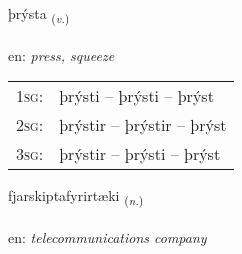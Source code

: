 \documentclass[frontgrid, backgrid]{flacards}\usepackage[]{graphicx}\usepackage[]{xcolor}
\begin{document}
\renewcommand{\flhead}{\vskip5pt \fboxsep=0pt {\small\bfseries\footnotesize Sagnorð | Verb}}
\renewcommand{\fcfoot}{\vskip5pt \fboxsep=0pt \hspace{2pt}{\small\bfseries\footnotesize 3K}}

\renewcommand{\blhead}{\vskip5pt {\small\bfseries\footnotesize Sagnorð | Verb }}
\renewcommand{\bcfoot}{\vskip5pt \hspace{2pt}{\small\bfseries\footnotesize 3K}}


{þrýsta \small{\textsubscript{(\textit{v.})}} \\[1ex] %
\textphonetic{[θrista]} \\
en: \emph{press, squeeze} \\  [2ex]
\renewcommand*{\arraystretch}{0.8}
\begin{tabular}{p{1cm}l}
\textsc{1sg}: & þrýsti -- þrýsti -- þrýst \\ 
\textsc{2sg}: & þrýstir -- þrýstir -- þrýst \\ 
\textsc{3sg}: & þrýstir -- þrýsti -- þrýst \\ 
\end{tabular}
}

\renewcommand{\flhead}{\vskip5pt \fboxsep=0pt {\small\bfseries\footnotesize Nafnorð | Noun}}
\renewcommand{\fcfoot}{\vskip5pt \fboxsep=0pt \hspace{2pt}{\small\bfseries\footnotesize 3K}}

\renewcommand{\blhead}{\vskip5pt {\small\bfseries\footnotesize Nafnorð | Noun }}
\renewcommand{\bcfoot}{\vskip5pt \hspace{2pt}{\small\bfseries\footnotesize 3K}}


{fjarskiptafyrirtæki \small{\textsubscript{(\textit{n.})}} \\[1ex] %
 \\
en: \emph{telecommunications company} \\  [2ex]
\renewcommand*{\arraystretch}{0.8}
}
\end{document}
